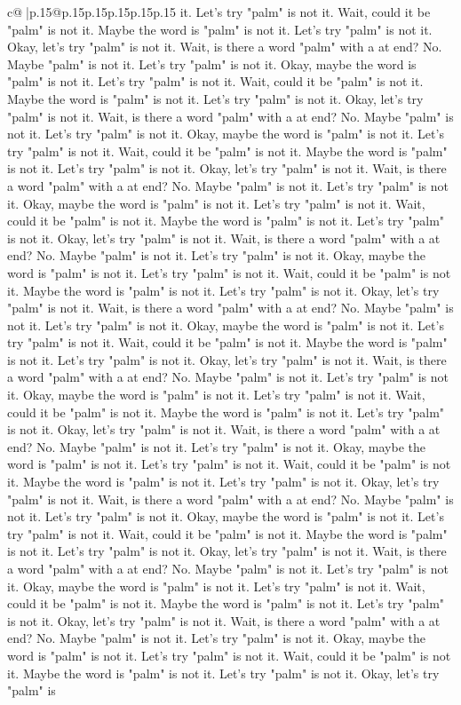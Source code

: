 \documentclass{article}
\begin{document}
{\begin{supertabular}{c@{$\;$}|p{.15\linewidth}@{}p{.15\linewidth}p{.15\linewidth}p{.15\linewidth}p{.15\linewidth}p{.15\linewidth}}
{{{it. Let's try "palm" is not it. Wait, could it be "palm" is not it. Maybe the word is "palm" is not it. Let's try "palm" is not it. Okay, let's try "palm" is not it. Wait, is there a word "palm" with a at end? No. Maybe "palm" is not it. Let's try "palm" is not it. Okay, maybe the word is "palm" is not it. Let's try "palm" is not it. Wait, could it be "palm" is not it. Maybe the word is "palm" is not it. Let's try "palm" is not it. Okay, let's try "palm" is not it. Wait, is there a word "palm" with a at end? No. Maybe "palm" is not it. Let's try "palm" is not it. Okay, maybe the word is "palm" is not it. Let's try "palm" is not it. Wait, could it be "palm" is not it. Maybe the word is "palm" is not it. Let's try "palm" is not it. Okay, let's try "palm" is not it. Wait, is there a word "palm" with a at end? No. Maybe "palm" is not it. Let's try "palm" is not it. Okay, maybe the word is "palm" is not it. Let's try "palm" is not it. Wait, could it be "palm" is not it. Maybe the word is "palm" is not it. Let's try "palm" is not it. Okay, let's try "palm" is not it. Wait, is there a word "palm" with a at end? No. Maybe "palm" is not it. Let's try "palm" is not it. Okay, maybe the word is "palm" is not it. Let's try "palm" is not it. Wait, could it be "palm" is not it. Maybe the word is "palm" is not it. Let's try "palm" is not it. Okay, let's try "palm" is not it. Wait, is there a word "palm" with a at end? No. Maybe "palm" is not it. Let's try "palm" is not it. Okay, maybe the word is "palm" is not it. Let's try "palm" is not it. Wait, could it be "palm" is not it. Maybe the word is "palm" is not it. Let's try "palm" is not it. Okay, let's try "palm" is not it. Wait, is there a word "palm" with a at end? No. Maybe "palm" is not it. Let's try "palm" is not it. Okay, maybe the word is "palm" is not it. Let's try "palm" is not it. Wait, could it be "palm" is not it. Maybe the word is "palm" is not it. Let's try "palm" is not it. Okay, let's try "palm" is not it. Wait, is there a word "palm" with a at end? No. Maybe "palm" is not it. Let's try "palm" is not it. Okay, maybe the word is "palm" is not it. Let's try "palm" is not it. Wait, could it be "palm" is not it. Maybe the word is "palm" is not it. Let's try "palm" is not it. Okay, let's try "palm" is not it. Wait, is there a word "palm" with a at end? No. Maybe "palm" is not it. Let's try "palm" is not it. Okay, maybe the word is "palm" is not it. Let's try "palm" is not it. Wait, could it be "palm" is not it. Maybe the word is "palm" is not it. Let's try "palm" is not it. Okay, let's try "palm" is not it. Wait, is there a word "palm" with a at end? No. Maybe "palm" is not it. Let's try "palm" is not it. Okay, maybe the word is "palm" is not it. Let's try "palm" is not it. Wait, could it be "palm" is not it. Maybe the word is "palm" is not it. Let's try "palm" is not it. Okay, let's try "palm" is not it. Wait, is there a word "palm" with a at end? No. Maybe "palm" is not it. Let's try "palm" is not it. Okay, maybe the word is "palm" is not it. Let's try "palm" is not it. Wait, could it be "palm" is not it. Maybe the word is "palm" is not it. Let's try "palm" is not it. Okay, let's try "palm" is }}}
\end{supertabular}}
\end{document}
